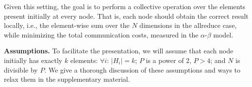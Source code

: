 \documentclass[11pt]{article}
\renewcommand{\paragraph}[1]{\vspace{0.1em} \noindent \textbf{#1}}
\begin{document}
Given this setting, the goal is to perform a collective operation over
the elements present initially at every node. That is, each node should
obtain the correct result locally, i.e., the element-wise sum over the
$N$ dimensions in the allreduce case, while minimizing the total
communication costs, measured in the $\alpha$-$\beta$ model. 

%
%

\paragraph{Assumptions.}
To facilitate the presentation, we will assume that each node initially has exactly $k$ elements: $\forall i:\,\vert
H_i \vert = k$; $P$ is a power of $2$, $P > 4$; and $N$ is divisible by $P$.
We give a thorough discussion of these assumptions and ways to relax them in the supplementary material. 
\end{document}
